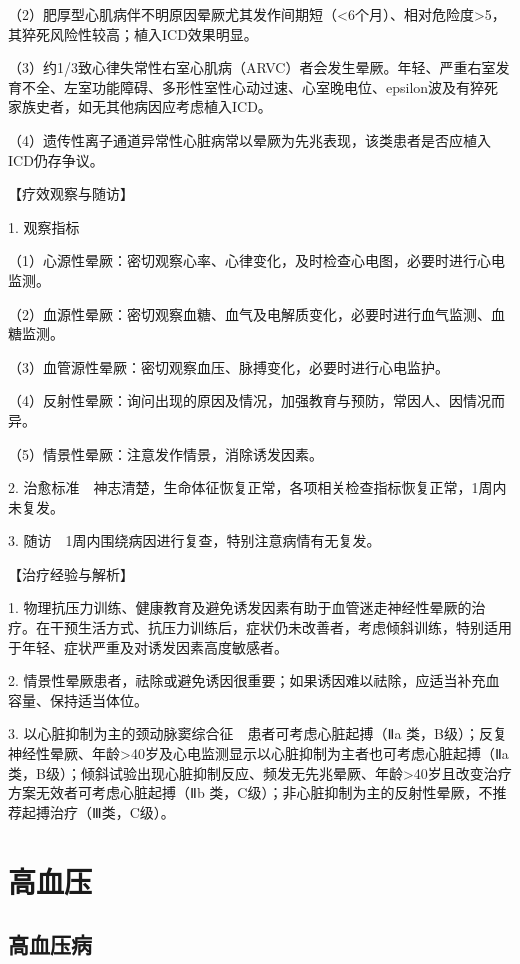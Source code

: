 （2）肥厚型心肌病伴不明原因晕厥尤其发作间期短（\textless{}6个月）、相对危险度\textgreater{}5，其猝死风险性较高；植入ICD效果明显。

（3）约1/3致心律失常性右室心肌病（ARVC）者会发生晕厥。年轻、严重右室发育不全、左室功能障碍、多形性室性心动过速、心室晚电位、epsilon波及有猝死家族史者，如无其他病因应考虑植入ICD。

（4）遗传性离子通道异常性心脏病常以晕厥为先兆表现，该类患者是否应植入ICD仍存争议。

【疗效观察与随访】

1. 观察指标

（1）心源性晕厥：密切观察心率、心律变化，及时检查心电图，必要时进行心电监测。

（2）血源性晕厥：密切观察血糖、血气及电解质变化，必要时进行血气监测、血糖监测。

（3）血管源性晕厥：密切观察血压、脉搏变化，必要时进行心电监护。

（4）反射性晕厥：询问出现的原因及情况，加强教育与预防，常因人、因情况而异。

（5）情景性晕厥：注意发作情景，消除诱发因素。

2.
治愈标准　神志清楚，生命体征恢复正常，各项相关检查指标恢复正常，1周内未复发。

3. 随访　1周内围绕病因进行复查，特别注意病情有无复发。

【治疗经验与解析】

1.
物理抗压力训练、健康教育及避免诱发因素有助于血管迷走神经性晕厥的治疗。在干预生活方式、抗压力训练后，症状仍未改善者，考虑倾斜训练，特别适用于年轻、症状严重及对诱发因素高度敏感者。

2.
情景性晕厥患者，祛除或避免诱因很重要；如果诱因难以祛除，应适当补充血容量、保持适当体位。

3. 以心脏抑制为主的颈动脉窦综合征　患者可考虑心脏起搏（Ⅱ{a}
类，B级）；反复神经性晕厥、年龄\textgreater{}40岁及心电监测显示以心脏抑制为主者也可考虑心脏起搏（Ⅱ{a}
类，B级）；倾斜试验出现心脏抑制反应、频发无先兆晕厥、年龄\textgreater{}40岁且改变治疗方案无效者可考虑心脏起搏（Ⅱ{b}
类，C级）；非心脏抑制为主的反射性晕厥，不推荐起搏治疗（Ⅲ类，C级）。


\section{高血压}

\subsection{高血压病}


